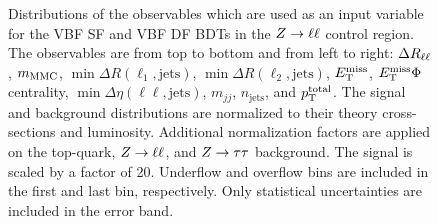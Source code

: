 \begin{figure}[htb]
\begin{subfigure}[t]{0.3\textwidth}
    \end{subfigure}
    \caption{Distributions of the observables which are used as an input variable for the VBF SF and VBF DF BDTs in the $Z \to \ell \ell$ control region.
             The observables are from top to bottom and from left to right: $\Delta R_{\ell\ell}$, $m_\text{MMC}$, $\min \Delta R (\ell_1, \text{jets})$, $\min \Delta R (\ell_2, \text{jets})$,
             $E_\text{T}^\text{miss}$, $E_\text{T}^\text{miss} \Phi$ centrality, $\min \Delta \eta (\ell\ell, \text{jets})$, $m_{jj}$, $n_\text{jets}$, and $p_\text{T}^\text{total}$.
             The signal and background distributions are normalized to their theory cross-sections and luminosity.
             Additional normalization factors are applied on the top-quark, $Z \to \ell \ell$, and $Z \to \tau \tau$ background.
             The signal is scaled by a factor of 20.
             Underflow and overflow bins are included in the first and last bin, respectively.
             Only statistical uncertainties are included in the error band.}\label{fig:mva:modeling:cr:vbfzll}
\end{figure}


